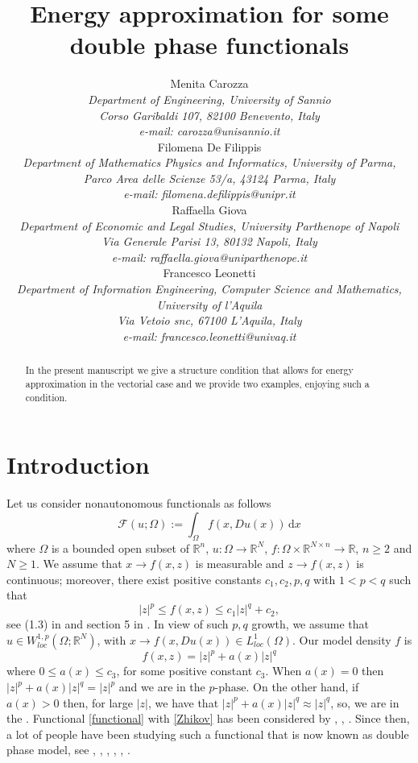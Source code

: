 \documentclass[a4paper,10pt]{article}
\title{\sc{Regularity results for solutions to a class of obstacle problems}
\footnotetext{\hspace{-0.35cm} 2010 \emph{Mathematics Subject
Classification}. 35J87, 49J40.
\endgraf
{\it Key words and phrases}.  }}
\title{\textbf{
Energy approximation
for some double phase functionals}}
\author{
Menita Carozza\\
{\it  Department of Engineering, University of  Sannio}
\\ {\it Corso Garibaldi 107, 82100 Benevento, Italy}
\\ {\it e-mail: carozza@unisannio.it }
\bigskip
\\
 Filomena De Filippis\\
 {\it Department of  Mathematics  Physics and Informatics, University of Parma,  %
}\\ {\it  Parco Area delle Scienze 53/a, 43124 Parma, Italy} \\{\it  e-mail: filomena.defilippis@unipr.it }
 \bigskip
 \\
  Raffaella Giova\\
 {\it Department of Economic and Legal Studies, %
University Parthenope of Napoli}\\ {\it Via Generale Parisi 13, 80132 Napoli,  Italy} 
\\{\it  e-mail: raffaella.giova@uniparthenope.it}
 \bigskip
\\
 Francesco Leonetti\\
 {\it Department of Information Engineering, Computer Science and Mathematics,}
 \\
 {\it University of l'Aquila}\\ {\it Via Vetoio snc, 
67100 L'Aquila, Italy} \\{\it  e-mail: francesco.leonetti@univaq.it}}
\newcommand{\numberset}{\mathbb}
\newcommand{\R}{\numberset{R}}
\theoremstyle{plain}
\theoremstyle{definition}
\def\dx{{\mathrm d}x}
\def\R{\mathbb{R}}
\numberwithin{equation}{section} \makeatletter
\begin{document}
	\maketitle
    \begin{abstract}
       \noindent
In the present manuscript we give a structure condition that allows for energy approximation in the vectorial case and we provide two examples, enjoying such a condition.

    \end{abstract}
	\section{Introduction}
	\noindent
Let us consider nonautonomous functionals as follows
\begin{equation}\label{functional}
  \mathcal{F}(u; \Omega):=\int_{\Omega}f(x, Du(x))\, \dx  
\end{equation}
where $\Omega$ is a bounded open subset of $\R^n$, $u:\Omega \rightarrow \R^N$, $f: \Omega \times \R^{N\times n} \rightarrow \R$,  $n\ge 2$ and $N \ge 1$. We assume that 
$x \to f(x,z)$ is measurable and $z \to f(x,z)$ is continuous; moreover, 
there exist positive constants $c_1,c_2, p, q$ with $1<p<q$ such that 
\begin{equation}\label{crescita pq}
  |z|^p \le f(x,z) \le c_1 |z|^q+c_2,
\end{equation} 
see (1.3) in \cite{Marcellini1989} and section 5 in \cite{Mingione_survey2006}.
In view of such $p,q$ growth, we assume that $u \in W^{1,p}_{loc}(\Omega;\mathbb{R}^N)$, with $x \to f(x,Du(x)) \in L^1_{loc}(\Omega)$.
Our model density $f$ is 
\begin{equation}\label{Zhikov}
    f(x, z)=|z|^p +a(x)|z|^q
\end{equation}
where $0\le a(x)\le c_3$, for some positive constant $c_3$.
When $a(x) = 0$ then  $|z|^{p} + a(x) |z|^{q} =  |z|^{p}$ and we are in the $\text{${p}$-phase}$. On the other hand, if $a(x) > 0$ then, for large $|z|$, we have that $|z|^{p} + a(x) |z|^{q} \approx  |z|^{q}$, so, we are in the . Functional \eqref{functional}  with \eqref{Zhikov} has been considered  
by \cite{Zhikov}, \cite{EspLeoMin-2004}, 
\cite{FonMalMin}.
\noindent
Since then, a lot of people have been studying such a functional that is now known as double phase model, see \cite{Colombo-Mingione}, \cite{Colombo-Mingione-2}, \cite{Baroni-Colombo-Mingione}
\cite{Eleuteri-Marcellini-Mascolo}, 
\cite{Balci-Diening-Surnachev}, \cite{BCDFM}, \cite{Kinnunen-Nastasi-Camacho}.
\end{document}
